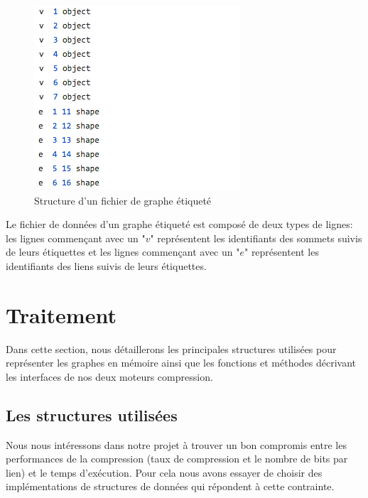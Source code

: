 \begin{itemize}[label=$\bullet$]
\begin{figure}[H]
	\label{Img:etiqGr}
	\includegraphics[scale=0.6]{ressources/image/etiquegr.png}
	\caption{Structure d'un fichier de graphe étiqueté}
 \end{figure}

Le fichier de données d'un graphe étiqueté est composé de deux types de lignes: les lignes commençant avec un "$v$" représentent les identifiants des sommets suivis de leurs étiquettes et les lignes commençant avec un "$e$" représentent les identifiants des liens suivis de leurs étiquettes.
	
	\end{itemize}
	
	
	
	\section{Traitement}

Dans cette section, nous détaillerons les principales structures utilisées pour représenter les graphes en mémoire ainsi que les fonctions et méthodes décrivant les interfaces de nos deux moteurs compression. 
\subsection{Les structures utilisées }
Nous nous intéressons dans notre projet à trouver un bon compromis entre les performances de la compression (taux de compression et le nombre de bits par lien) et le temps d'exécution. Pour cela nous avons essayer de choisir des implémentations de structures de données qui répondent à cette contrainte.

